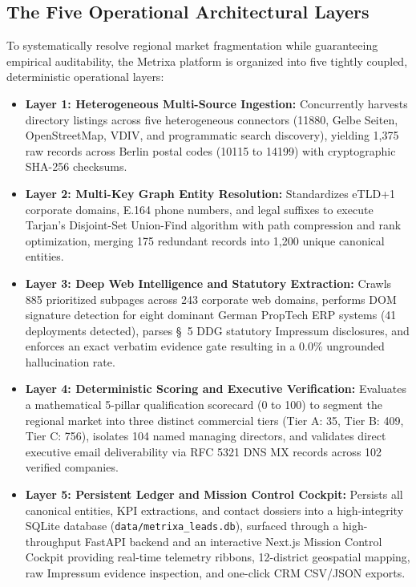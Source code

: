 \documentclass[11pt,a4paper]{article}
\begin{document}
\subsection{The Five Operational Architectural Layers}
To systematically resolve regional market fragmentation while guaranteeing empirical auditability, the Metrixa platform is organized into five tightly coupled, deterministic operational layers:
\begin{itemize}
    \item \textbf{Layer 1: Heterogeneous Multi-Source Ingestion:} Concurrently harvests directory listings across five heterogeneous connectors (11880, Gelbe Seiten, OpenStreetMap, VDIV, and programmatic search discovery), yielding 1,375 raw records across Berlin postal codes (10115 to 14199) with cryptographic SHA-256 checksums.
    \item \textbf{Layer 2: Multi-Key Graph Entity Resolution:} Standardizes eTLD+1 corporate domains, E.164 phone numbers, and legal suffixes to execute Tarjan's Disjoint-Set Union-Find algorithm with path compression and rank optimization, merging 175 redundant records into 1,200 unique canonical entities.
    \item \textbf{Layer 3: Deep Web Intelligence and Statutory Extraction:} Crawls 885 prioritized subpages across 243 corporate web domains, performs DOM signature detection for eight dominant German PropTech ERP systems (41 deployments detected), parses \S~5 DDG statutory Impressum disclosures, and enforces an exact verbatim evidence gate resulting in a 0.0\% ungrounded hallucination rate.
    \item \textbf{Layer 4: Deterministic Scoring and Executive Verification:} Evaluates a mathematical 5-pillar qualification scorecard (0 to 100) to segment the regional market into three distinct commercial tiers (Tier A: 35, Tier B: 409, Tier C: 756), isolates 104 named managing directors, and validates direct executive email deliverability via RFC 5321 DNS MX records across 102 verified companies.
    \item \textbf{Layer 5: Persistent Ledger and Mission Control Cockpit:} Persists all canonical entities, KPI extractions, and contact dossiers into a high-integrity SQLite database (\texttt{data/metrixa\_leads.db}), surfaced through a high-throughput FastAPI backend and an interactive Next.js Mission Control Cockpit providing real-time telemetry ribbons, 12-district geospatial mapping, raw Impressum evidence inspection, and one-click CRM CSV/JSON exports.
\end{itemize}
\end{document}
